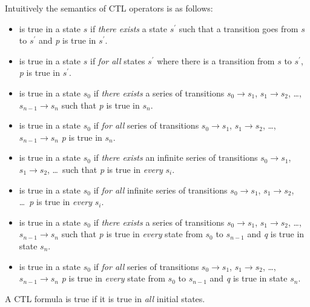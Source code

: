 Intuitively the semantics of CTL operators is as follows:
%
\begin{itemize}
  \item {}
        is true in a state $s$ if \emph{there exists} a state
        $s^\prime$ such that a transition goes from $s$ to $s^\prime$
        and \textit{p} is true in $s^\prime$.
  \item {}
        is true in a state $s$ if \emph{for all} states $s^\prime$
        where there is a transition from $s$ to $s^\prime$, \textit{p}
        is true in $s^\prime$.
  \item {}
       is true in a state $s_0$ if \emph{there exists} a series of
       transitions $s_0 \rightarrow s_1$, $s_1 \rightarrow s_2$,
       \ldots, $s_{n-1} \rightarrow s_n$ such that \textit{p} is true
       in $s_n$.
  \item {}
       is true in a state $s_0$ if \emph{for all} series of
       transitions $s_0 \rightarrow s_1$, $s_1 \rightarrow s_2$,
       \ldots, $s_{n-1} \rightarrow s_n$ \textit{p} is true in $s_n$.

  \item {}
       is true in a state $s_0$ if \emph{there exists} an infinite
       series of transitions $s_0 \rightarrow s_1$, $s_1 \rightarrow
       s_2$, \ldots~such that \textit{p} is true in \emph{every}
       $s_i$.
  \item {}
       is true in a state $s_0$ if \emph{for all} infinite series of
       transitions $s_0 \rightarrow s_1$, $s_1 \rightarrow s_2$,
       \ldots~\textit{p} is true in \emph{every} $s_i$.
  \item {}
       is true in a state $s_0$ if \emph{there exists} a series of
       transitions $s_0 \rightarrow s_1$, $s_1 \rightarrow s_2$,
       \ldots, $s_{n-1} \rightarrow s_n$ such that \textit{p} is true
       in \emph{every} state from $s_0$ to $s_{n-1}$ and \textit{q} is
       true in state $s_n$.
  \item {}
       is true in a state $s_0$ if \emph{for all} series of
       transitions $s_0 \rightarrow s_1$, $s_1 \rightarrow s_2$,
       \ldots, $s_{n-1} \rightarrow s_n$ \textit{p} is true in
       \emph{every} state from $s_0$ to $s_{n-1}$ and \textit{q} is
       true in state $s_n$.
\end{itemize}
A CTL formula is true if it is true in \emph{all} initial states.

